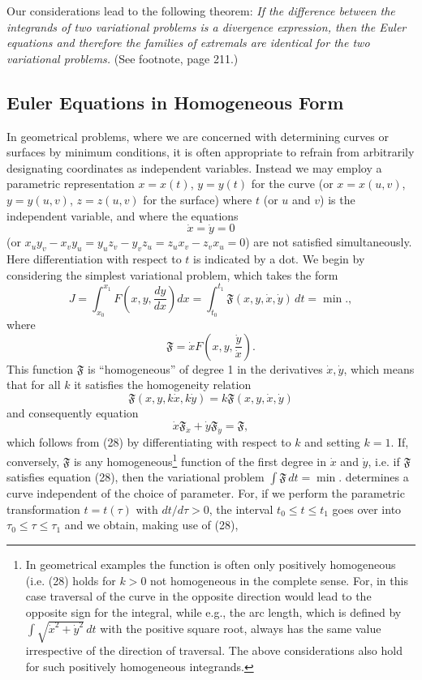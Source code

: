 Our considerations lead to the following theorem: \emph{If the difference between the integrands of two variational problems is a divergence expression, then the Euler equations and therefore the families of extremals are identical for the two variational problems.} (See footnote, page 211.)

\subsection{Euler Equations in Homogeneous Form}
In geometrical problems, where we are concerned with determining curves or surfaces by minimum conditions, it is often appropriate to refrain from arbitrarily designating coordinates as independent variables. Instead we may employ a parametric representation $x=x(t)$, $y=y(t)$ for the curve (or $x=x(u,v)$, $y=y(u,v)$, $z=z(u,v)$ for the surface) where $t$ (or $u$ and $v$) is the independent variable, and where the equations
\[
\dot x=\dot y=0
\]
(or $x_uy_v-x_vy_u=y_uz_v-y_vz_u=z_ux_v-z_vx_u=0$) are not satisfied simultaneously. Here differentiation with respect to $t$ is indicated by a dot. We begin by considering the simplest variational problem, which takes the form
\begin{equation}\tag{27}
J=\int_{x_0}^{x_1}F\left(x,y,\frac{dy}{dx}\right)dx
=\int_{t_0}^{t_1}\mathfrak F(x,y,\dot x,\dot y)\,dt=\min.,
\end{equation}
where
\[
\mathfrak F=\dot xF\left(x,y,\frac{\dot y}{\dot x}\right).
\]
This function $\mathfrak F$ is ``homogeneous'' of degree 1 in the derivatives $\dot x,\dot y$, which means that for all $k$ it satisfies the homogeneity relation
\begin{equation}\tag{28}
\mathfrak F(x,y,k\dot x,k\dot y)=k\mathfrak F(x,y,\dot x,\dot y)
\end{equation}
and consequently equation
\begin{equation}\tag{29}
\dot x\mathfrak F_{\dot x}+\dot y\mathfrak F_{\dot y}=\mathfrak F,
\end{equation}
which follows from (28) by differentiating with respect to $k$ and setting $k=1$. If, conversely, $\mathfrak F$ is any homogeneous\footnote{In geometrical examples the function is often only positively homogeneous (i.e. (28) holds for $k>0$ not homogeneous in the complete sense. For, in this case traversal of the curve in the opposite direction would lead to the opposite sign for the integral, while e.g., the arc length, which is defined by $\int\sqrt{\dot x^2+\dot y^2}\,dt$ with the positive square root, always has the same value irrespective of the direction of traversal. The above considerations also hold for such positively homogeneous integrands.} function of the first degree in $\dot x$ and $\dot y$, i.e. if $\mathfrak F$ satisfies equation (28), then the variational problem $\int\mathfrak F\,dt=\min.$ determines a curve independent of the choice of parameter. For, if we perform the parametric transformation $t=t(\tau)$ with $dt/d\tau>0$, the interval $t_0\le t\le t_1$ goes over into $\tau_0\le\tau\le\tau_1$ and we obtain, making use of (28),
